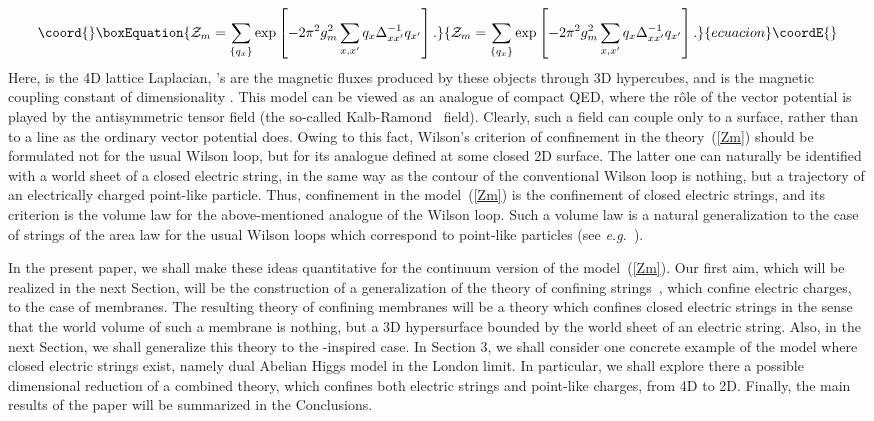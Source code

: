 \documentclass[a4paper,12pt]{article}
\begin{document}
\begin{equation}\coord{}\boxEquation{
\label{Zm}
{\cal Z}_m=\sum\limits_{\{q_x\}}^{}\exp\left[-2\pi^2g_m^2\sum\limits_{x,x'}^{}q_x\Delta^{-1}_{xx'}q_{x'}\right].
}{
{\cal Z}_m=\sum\limits_{\{q_x\}}^{}\exp\left[-2\pi^2g_m^2\sum\limits_{x,x'}^{}q_x\Delta^{-1}_{xx'}q_{x'}\right].
}{ecuacion}\coordE{}\end{equation}
Here, \myHighlight{$\Delta$}\coordHE{} is the 4D lattice Laplacian, \coordHE{}'s are the magnetic fluxes produced by these objects through 
3D hypercubes, and \coordHE{} is the magnetic coupling constant of dimensionality 
\coordHE{}. This model can be viewed as an analogue of compact QED, where the r\^ole of the vector 
potential is played by the antisymmetric tensor field (the so-called Kalb-Ramond~\cite{3} field). Clearly, such a 
field can couple only to a surface, rather than to a line as the ordinary vector potential does. Owing to this fact,
Wilson's criterion of confinement in the theory~(\ref{Zm}) should be formulated not for the usual Wilson loop, but for its analogue
defined at some closed 2D surface. The latter one can naturally be identified with a world sheet of a closed 
electric string, in the same way as the contour of the conventional Wilson loop is nothing, but a trajectory 
of an electrically charged point-like particle. Thus, confinement in the model~(\ref{Zm}) is
the confinement of closed electric strings, and its criterion is the volume law for the above-mentioned analogue of the 
Wilson loop. Such a volume law is a natural generalization to the case of strings
of the area law for the usual Wilson loops which correspond to point-like particles (see {\it e.g.}~\cite{dia}).

In the present paper, we shall make these ideas quantitative for the continuum version of the model~(\ref{Zm}). 
Our first aim, which will be realized in the next Section, will be the construction of a generalization 
of the theory of confining strings~\cite{2}, which confine electric charges, 
to the case of membranes. The resulting theory of confining membranes will be a theory which confines 
closed electric strings in the sense that the world volume of such a membrane is nothing, but a 3D hypersurface bounded by the 
world sheet of an electric string. Also, in the next Section, we shall generalize this theory to the \coordHE{}-inspired case.
In Section 3, we shall consider one concrete example of the model where closed electric strings exist, namely dual
Abelian Higgs model in the London limit. In particular, we shall explore there a possible dimensional reduction of a 
combined theory, which confines both electric strings and point-like charges, from 4D to 2D. Finally, the main results of the 
paper will be summarized in the Conclusions.
\end{document}
